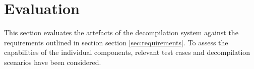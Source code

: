 
%

%
%

\section{Evaluation}
\label{sec:evaluation}

This section evaluates the artefacts of the decompilation system against the requirements outlined in section section \ref{sec:requirements}. To assess the capabilities of the individual components, relevant test cases and decompilation scenarios have been considered.






